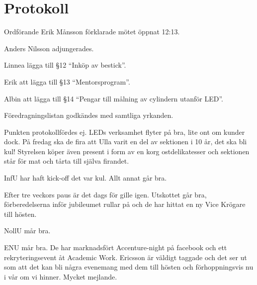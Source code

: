 \documentclass[10pt]{article}
\def\mo{Erik Månsson}
\begin{document}
\section*{Protokoll}
\begin{paragrafer}
Ordförande {\mo} förklarade mötet öppnat 12:13.

{\valavmo}

{\valavms}

{\valavj}

{\tosg}

Anders Nilsson adjungerades.


Linnea \ypa lägga till \S12 ``Inköp av bestick''.

Erik \ypa att lägga till \S13 ``Mentorsprogram''.

Albin \ypa att lägga till \S14 ``Pengar till målning av cylindern utanför LED''.

Föredragningslistan godkändes med samtliga yrkanden.

\begin{fyllnadsval} %
\end{fyllnadsval}

\begin{paragrafer}
Punkten protokollfördes ej.
LEDs verksamhet flyter på bra, lite ont om kunder dock. På fredag ska de fira att Ulla varit en del av sektionen i 10 år, det ska bli kul! Styrelsen köper även present i form av en korg ostdelikatesser och sektionen står för mat och tårta till själva firandet.

InfU har haft kick-off det var kul. Allt annat går bra.

Efter tre veckors paus är det dags för gille igen. Utskottet går bra, förberedelserna inför jubileumet rullar på och de har hittat en ny Vice Krögare till hösten.

NollU mår bra.

ENU mår bra. De har marknadsfört Accenture-night på facebook och ett rekryteringsevent åt Academic Work. Ericsson är väldigt taggade och det ser ut som att det kan bli några evenemang med dem till hösten och förhoppningsvis nu i vår om vi hinner. Mycket mejlande.


\end{paragrafer}
\end{paragrafer}
\end{document}
